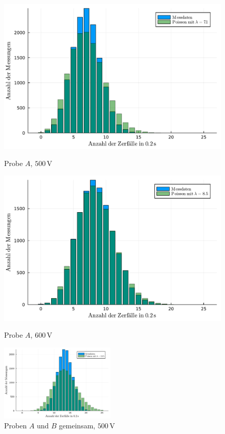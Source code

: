 \documentclass[12pt,a4paper]{scrartcl}
\numberwithin{equation}{section} %
\begin{document}
\begin{figure}
	\centering
	\begin{minipage}{0.49\textwidth}
		\centering
		\includegraphics[width=\textwidth]{../media/B3.1/poisson1.pdf}
		\caption*{Probe $A$, $500 \mathrm{\, V}$}
	\end{minipage}
	\begin{minipage}{0.49\textwidth}
		\centering
		\includegraphics[width=\textwidth]{../media/B3.1/poisson2.pdf}
		\caption*{Probe $A$, $600 \mathrm{\, V}$}
	\end{minipage}
	\vspace{3pt}

	\includegraphics[width=0.49\textwidth]{../media/B3.1/poisson3.pdf}
	\caption*{Proben $A$ und $B$ gemeinsam, $500 \mathrm{\, V}$}
	\vspace{3pt}
	

\end{figure}
\end{document}
